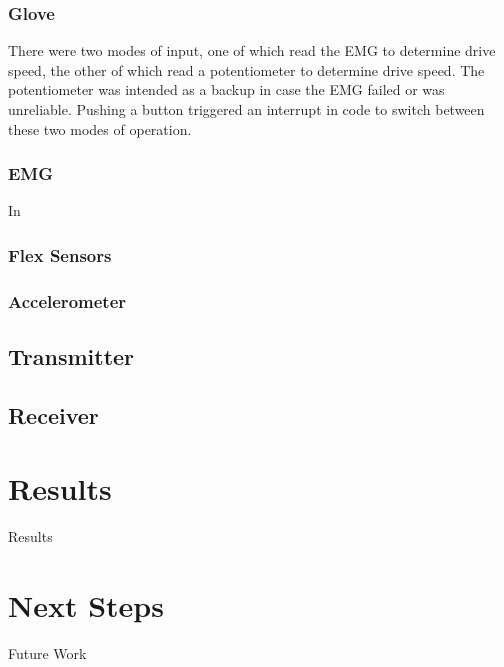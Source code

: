 \documentclass[12pt,scrartcl,titlepage]{article}
\begin{document}
\subsubsection{Glove}

There were two modes of input, one of which read the EMG to determine drive speed, the other of which read a potentiometer to determine drive speed.  The potentiometer was intended as a backup in case the EMG failed or was unreliable.  Pushing a button triggered an interrupt in code to switch between these two modes of operation.

\subsubsection{EMG}

In 

\subsubsection{Flex Sensors}

\subsubsection{Accelerometer}

\subsection{Transmitter}

\subsection{Receiver}

\subsubsection{}

\section{Results}

Results

\section{Next Steps}

Future Work
\end{document}
